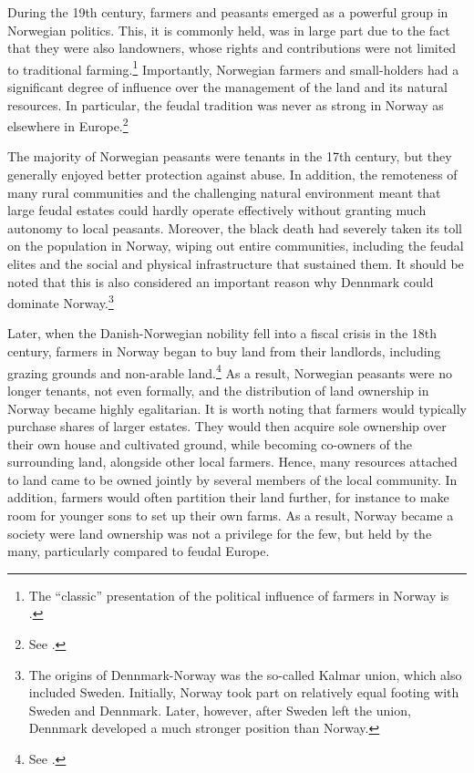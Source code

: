 During the 19th century, farmers and peasants emerged as a powerful group in Norwegian politics. This, it is commonly held, was in large part due to the fact that they were also landowners, whose rights and contributions were not limited to traditional farming.\footnote{The ``classic'' presentation of the political influence of farmers in Norway is \cite{koht26}.} Importantly, Norwegian farmers and small-holders had a significant degree of influence over the management of the land and its natural resources. In particular, the feudal tradition was never as strong in Norway as elsewhere in Europe.\footnote{See \cite[59-60]{pryser99}.}

The majority of Norwegian peasants were tenants in the 17th century, but they generally enjoyed better protection against abuse. In addition, the remoteness of many rural communities and the challenging natural environment meant that large feudal estates could hardly operate effectively without granting much autonomy to local peasants. Moreover, the black death had severely taken its toll on the population in Norway, wiping out entire communities, including the feudal elites and the social and physical infrastructure that sustained them. It should be noted that this is also considered an important reason why Dennmark could dominate Norway.\footnote{The origins of Dennmark-Norway was the so-called Kalmar union, which also included Sweden. Initially, Norway took part on relatively equal footing with Sweden and Dennmark. Later, however, after Sweden left the union, Dennmark developed a much stronger position than Norway.}

Later, when the Danish-Norwegian nobility fell into a fiscal crisis in the 18th century, farmers in Norway began to buy land from their landlords, including grazing grounds and non-arable land.\footnote{See \cite[59-60]{pryser99}.} As a result, Norwegian peasants were no longer tenants, not even formally, and the distribution of land ownership in Norway became highly egalitarian. It is worth noting that farmers would typically purchase shares of larger estates. They would then acquire sole ownership over their own house and cultivated ground, while becoming co-owners of the surrounding land, alongside other local farmers. Hence, many resources attached to land came to be owned jointly by several members of the local community. In addition, farmers would often partition their land further, for instance to make room for younger sons to set up their own farms. As a result, Norway became a society were land ownership was not a privilege for the few, but held by the many, particularly compared to feudal Europe.


